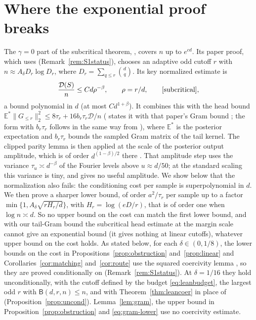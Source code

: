 \documentclass[11pt]{article}
\theoremstyle{definition}\newtheorem{assumption}[theorem]{Assumption}
\theoremstyle{remark}\newtheorem{remark}[theorem]{Remark}
\newcommand{\E}{\mathbb E}
\begin{document}
\section{Where the exponential proof breaks}\label{sec:obstruction}
The $\gamma=0$ part of the subcritical theorem,
\cite[Theorem~9.2]{subcritical}, covers $n$ up to $e^{cd}$. Its paper
proof, which uses \cite[Lemma~4.4]{subcritical}
(Remark~\ref{rem:S1status}), chooses an adaptive odd cutoff $r$ with
$n\approx A_\delta D_r\log D_r$, where $D_r=\sum_{q\le r}\binom dq$. Its
key normalized estimate is
\[
 \frac{\mathcal D(S)}n\le Cd\rho^{-\beta},\qquad \rho=r/d,
 \qquad\text{\cite[eq.~(42)]{subcritical}},
\]
a bound polynomial in $d$ (at most $Cd^{1+\beta}$). It combines this with
the head bound
$\E^*\|G_{\le r}\|_2^2\le8\tau_r+16b_r\tau_r\mathcal D/n$
(\cite[eq.~(45)]{subcritical} states it with that paper's Gram bound
\cite[eq.~(44)]{subcritical}; the form with $b_r\tau_r$ follows in the same
way from \cite[eqs.~(41) and (43)]{subcritical}), where $\E^*$ is the
posterior expectation and $b_r\tau_r$ bounds the sampled Gram matrix of
the tail kernel. The clipped
parity lemma is then applied at the scale of the posterior output
amplitude, which is of order $d^{(1-\beta)/2}$ there
\cite[Lemma~7.5]{subcritical}. That amplitude step uses the variance
$\tau_u\asymp d^{-\beta}$ of the Fourier levels above $u\approx d/50$; at the
standard scaling this variance is tiny, and \cite[Lemma~7.5]{subcritical}
gives no useful amplitude. We show below that the normalization
\cite[eq.~(42)]{subcritical} also fails: the
conditioning cost per sample is superpolynomial in $d$. We then prove a
sharper lower bound, of order $a^2/\tau_r$ per sample up to a factor
$\min\{1,A_\delta\sqrt{rH_r/d}\}$, with $H_r=\log(eD/r)$, that is of order
one when $\log n\asymp d$. So no upper bound on the cost can match the
first lower bound, and with our tail-Gram bound the subcritical head
estimate at the margin scale cannot give an exponential bound (it gives
nothing at linear cutoffs), whatever upper bound on the cost holds. As
stated below, for each $\delta\in(0,1/8)$, the lower bounds on the cost in
Propositions~\ref{prop:obstruction} and~\ref{prop:linear} and
Corollaries~\ref{cor:matching} and~\ref{cor:route} use the squared
coercivity lemma \cite[Lemma~4.4]{subcritical}, so they are proved
conditionally on \cite[Lemma~4.1]{subcritical}
(Remark~\ref{rem:S1status}). At $\delta=1/16$ they hold unconditionally,
with the cutoff defined by the budget \eqref{eq:leanbudget}, the largest
odd $r$ with $\mathsf B(d,r,n)\le n$, and with Theorem~\ref{thm:leancoer}
in place of \cite[Lemma~4.4]{subcritical}
(Proposition~\ref{prop:uncond}). Lemma~\ref{lem:gram}, the upper bound in
Proposition~\ref{prop:obstruction} and \eqref{eq:gram-lower} use no
coercivity estimate.
\end{document}
